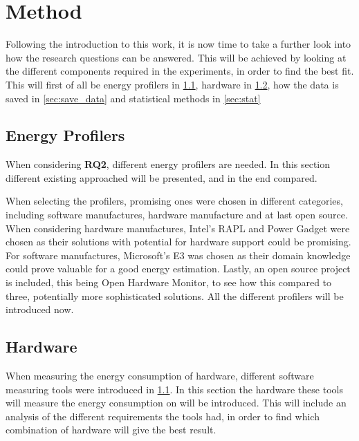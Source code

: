 \chapter{Method}\label{ch:method}

Following the introduction to this work, it is now time to take a further look into how the research questions can be answered. This will be achieved by looking at the different components required in the experiments, in order to find the best fit. This will first of all be energy profilers in \cref*{sec:energy_profilers}, hardware in \cref*{sec:hardware}, how the data is saved in \cref*{sec:save_data}  and statistical methods in \cref*{sec:stat}

\section{Energy Profilers}\label{sec:energy_profilers}

When considering \textbf{RQ2}, different energy profilers are needed. In this section different existing approached will be presented, and in the end compared.

When selecting the profilers, promising ones were chosen in different categories, including software manufactures, hardware manufacture and at last open source. When considering hardware manufactures, Intel's RAPL and Power Gadget were chosen as their solutions with potential for hardware support could be promising. For software manufactures, Microsoft's E3 was chosen as their domain knowledge could prove valuable for a good energy estimation. Lastly, an open source project is included, this being Open Hardware Monitor, to see how this compared to three, potentially more sophisticated solutions. All the different profilers will be introduced now.







\section{Hardware}\label{sec:hardware}

When measuring the energy consumption of hardware, different software measuring tools were introduced in \cref{sec:energy_profilers}. In this section the hardware these tools will measure the energy consumption on will be introduced. This will include an analysis of the different requirements the tools had, in order to find which combination of hardware will give the best result.


